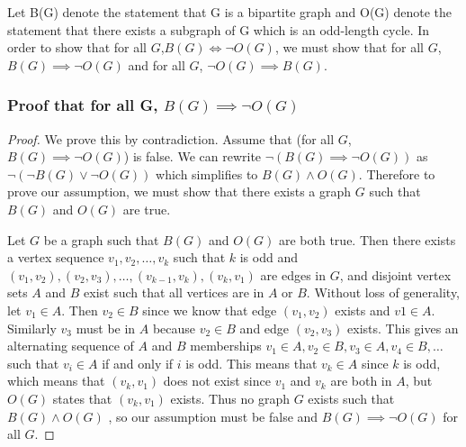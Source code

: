 \documentclass[12pt]{article}
\begin{document}
Let B(G) denote the statement that G is a bipartite graph and O(G) denote the statement that there exists a subgraph of G which is an odd-length cycle. In order to show that for all $G$,$B(G) \iff \neg O(G)$, we must show that for all $G$, $B(G) \implies \neg O(G)$ and for all $G$, $\neg O(G) \implies B(G)$.

\subsubsection*{Proof that for all G, $B(G) \implies \neg O(G)$}

\begin{proof}
We prove this by contradiction. Assume that (for all $G$, $B(G) \implies \neg O(G)$) is false. We can rewrite $\neg(B(G)\implies \neg O(G))$ as $\neg(\neg B(G)\vee \neg O(G))$  which simplifies to $B(G) \wedge O(G)$. Therefore to prove our assumption, we must show that there exists a graph $G$ such that $B(G)$ and $O(G)$ are true.

Let $G$ be a graph such that $B(G)$ and $O(G)$ are both true. Then there exists a vertex sequence $v_1, v_2, \ldots, v_k$ such that $k$ is odd and $(v_1, v_2), (v_2, v_3), \ldots, (v_{k-1}, v_k), (v_k, v_1)$ are edges in $G$, and disjoint vertex sets $A$ and $B$ exist such that all vertices are in $A$ or $B$. Without loss of generality, let $v_1 \in A$. Then $v_2 \in B$ since we know that edge $(v_1, v_2)$ exists and $v1 \in A$. Similarly $v_3$ must be in $A$ because $v_2 \in B$ and edge $(v_2, v_3)$ exists. This gives an alternating sequence of $A$ and $B$ memberships $v_1 \in A, v_2 \in B, v_3 \in A, v_4 \in B, \ldots$ such that $v_i \in A$ if and only if $i$ is odd. This means that $v_k \in A$ since $k$ is odd, which means that $(v_k, v_1)$ does not exist since $v_1$ and $v_k$ are both in $A$, but $O(G)$ states that $(v_k, v_1)$ exists. Thus no graph $G$ exists such that $B(G) \wedge O(G)$ , so our assumption must be false and  $B(G) \implies \neg O(G)$ for all $G$.
\end{proof}
\end{document}
